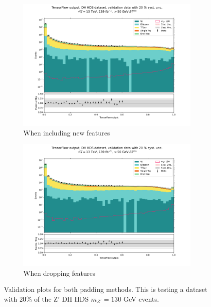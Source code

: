 \documentclass[12pt, a4paper]{book}
\begin{document}
\begin{figure}[!ht]
	\centering
	\begin{subfigure}[b]{0.49\textwidth}
      \centering
      \includegraphics[width=1\textwidth]{New_pad/VAL.pdf}
      \caption{When including new features}
   \end{subfigure}
   \hfill
	\begin{subfigure}[b]{0.49\textwidth}
      \centering
      \includegraphics[width=1\textwidth]{No_pad/VAL.pdf}
      \caption{When dropping features}
   \end{subfigure}
   \caption[Validation plots for both padding methods]{Validation plots for both padding methods.  This is testing a dataset with 20\% of the Z' DH HDS $m_{Z'}=130$ GeV events.}\label{fig:NN_pad_VAL}
\end{figure}
\end{document}
